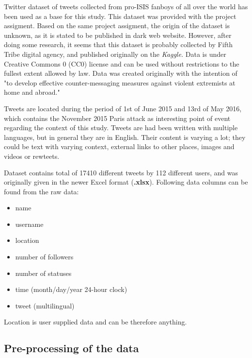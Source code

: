 \documentclass[conference]{IEEEtran}
\begin{document}
    Twitter dataset of tweets collected from pro-ISIS fanboys of all over the world has been used as a base for this study.
    This dataset was provided with the project assigment.
    Based on the same project assigment, the origin of the dataset is unknown, as it is stated to be published in dark web website.
    However, after doing some research, it seems that this dataset is probably collected by Fifth Tribe digital agency, and published originally on the \textit{Kaggle.}\cite{dataKaggleOrigin}
    Data is under Creative Commons 0 (CC0) license and can be used without restrictions to the fullest extent allowed by law.
    Data was created originally with the intention of "to develop effective counter-messaging measures against violent extremists at home and abroad."\cite{dataKaggleOrigin}

    Tweets are located during the period of 1st of June 2015 and 13rd of May 2016, which contains the November 2015 Paris attack as interesting
    point of event regarding the context of this study.
    Tweets are had been written with multiple languages, but in general they are in English.
    Their content is varying a lot; they could be text with varying context, external links to other places, images and videos or rewteets.

    Dataset contains total of 17410 different tweets by 112 different users, and was originally given in the newer Excel format (\textbf{.xlsx}).
    Following data columns can be found from the raw data:

    \begin{itemize}
        \item name
        \item username
        \item location
        \item number of followers
        \item number of statuses
        \item time (month/day/year 24-hour clock)
        \item tweet (multilingual)
    \end{itemize}

    Location is user supplied data and can be therefore anything.

    \subsection{Pre-processing of the data}\label{subsec:pre-processing-of-the-data}
\end{document}
